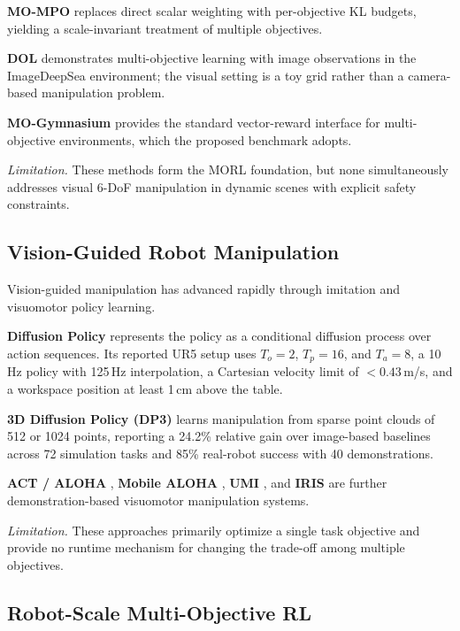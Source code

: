 \documentclass[11pt,a4paper]{article}
\begin{document}
\textbf{MO-MPO} \cite{abdolmaleki2022} replaces direct scalar weighting
with per-objective KL budgets, yielding a scale-invariant treatment of
multiple objectives.

\textbf{DOL} \cite{mossalam} demonstrates multi-objective learning with
image observations in the ImageDeepSea environment; the visual setting is
a toy grid rather than a camera-based manipulation problem.

\textbf{MO-Gymnasium} \cite{felten2023} provides the standard
vector-reward interface for multi-objective environments, which the
proposed benchmark adopts.

\textit{Limitation.} These methods form the MORL foundation, but none
simultaneously addresses visual 6-DoF manipulation in dynamic scenes with
explicit safety constraints.

\subsection{Vision-Guided Robot Manipulation}

Vision-guided manipulation has advanced rapidly through imitation and
visuomotor policy learning.

\textbf{Diffusion Policy} \cite{chi2023} represents the policy as a
conditional diffusion process over action sequences. Its reported UR5
setup uses $T_o=2$, $T_p=16$, and $T_a=8$, a 10\,Hz policy with 125\,Hz
interpolation, a Cartesian velocity limit of $<0.43$\,m/s, and a
workspace position at least 1\,cm above the table.

\textbf{3D Diffusion Policy (DP3)} \cite{ze2024} learns manipulation from
sparse point clouds of 512 or 1024 points, reporting a 24.2\% relative
gain over image-based baselines across 72 simulation tasks and 85\%
real-robot success with 40 demonstrations.

\textbf{ACT / ALOHA} \cite{zhao2023}, \textbf{Mobile ALOHA} \cite{fu2024},
\textbf{UMI} \cite{chi2024}, and \textbf{IRIS} \cite{jiang2025}
are further demonstration-based visuomotor manipulation systems.

\textit{Limitation.} These approaches primarily optimize a single task
objective and provide no runtime mechanism for changing the trade-off
among multiple objectives.

\subsection{Robot-Scale Multi-Objective RL}
\end{document}
